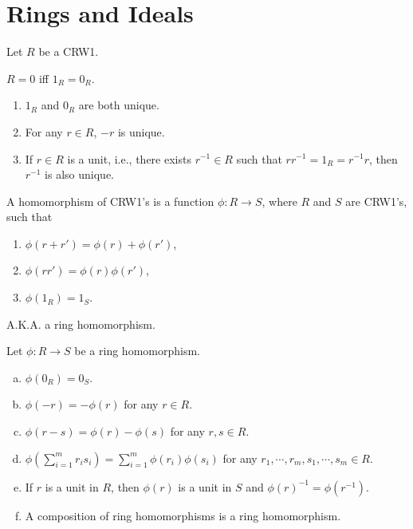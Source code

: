\chapter{Rings and Ideals}

Let $R$ be a CRW1.

\begin{fact}
    $R = 0$ iff $1_R = 0_R$.
\end{fact}

\begin{fact}
    \begin{enumerate}[(1)]
        \item $1_R$ and $0_R$ are both unique.
        \item For any $r \in R$, $-r$ is unique.
        \item If $r \in R$ is a unit, i.e., there exists $r^{-1} \in R$ such that $rr^{-1} = 1_R = r^{-1}r$, then $r^{-1}$ is also unique.
    \end{enumerate}
\end{fact}

\begin{definition}
    A homomorphism of CRW1's is a function $\phi: R \to S$, where $R$ and $S$ are CRW1's, such that 
    \begin{enumerate}[(1)]
        \item $\phi(r+r') = \phi(r) + \phi(r')$,
        \item $\phi(rr') = \phi(r) \phi(r')$,
        \item $\phi(1_R) = 1_S$.
    \end{enumerate}
    A.K.A. a ring homomorphism.
\end{definition}

\begin{fact}
    Let $\phi: R \to S$ be a ring homomorphism.
    \begin{enumerate}[(a)]
        \item $\phi(0_R) = 0_S$.
        \item $\phi(-r) = -\phi(r)$ for any $r \in R$.
        \item $\phi(r-s) = \phi(r) - \phi(s)$ for any $r,s \in R$.
        \item $\phi(\sum_{i=1}^mr_is_i) = \sum_{i=1}^m\phi(r_i)\phi(s_i)$ for any $r_1,\cdots,r_m,s_1,\cdots,s_m \in R$.
        \item If $r$ is a unit in $R$, then $\phi(r)$ is a unit in $S$ and $\phi(r)^{-1} = \phi(r^{-1})$.
        \item A composition of ring homomorphisms is a ring homomorphism.
    \end{enumerate}
\end{fact}

